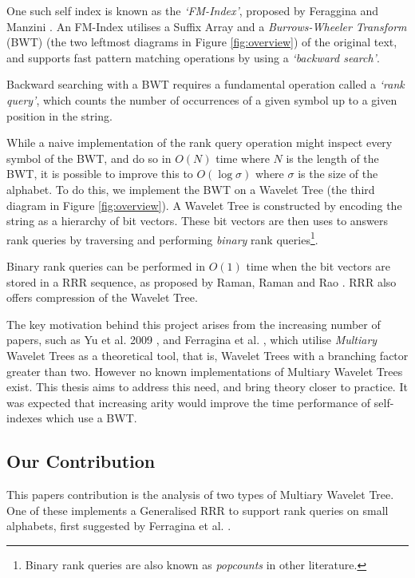One such self index is known as the \emph{`FM-Index'}, proposed by
Feraggina and Manzini \cite{ferragina2000}. An FM-Index utilises a 
Suffix Array and a \emph{Burrows-Wheeler Transform} (BWT) (the two leftmost 
diagrams in Figure \ref{fig:overview}) of the original text, and supports fast 
pattern matching operations by using a \emph{`backward search'}.

Backward searching with a BWT requires a fundamental operation called a 
\emph{`rank query'}, which counts the number of occurrences of a given symbol up 
to a given position in the string.

While a naive implementation of the rank query operation might inspect every 
symbol of the BWT, and do so in $O(N)$ time where $N$ is the length of the BWT, 
it is possible to improve this to $O(\log \sigma)$ where $\sigma$ is the size of 
the alphabet. To do this, we implement the BWT on a Wavelet Tree (the third 
diagram in Figure 
\ref{fig:overview}). A Wavelet Tree is constructed by encoding the string as a 
hierarchy of bit vectors. These bit vectors are then uses to answers rank 
queries by traversing and performing \emph{binary} rank queries\footnote{ Binary rank queries are also known as \emph{popcounts} in other literature.}.

Binary rank queries can be performed in $O(1)$ time when the bit vectors are stored in
a RRR sequence, as proposed by Raman, Raman and Rao \cite{raman2007}. RRR also 
offers compression of the Wavelet Tree.

The key motivation behind this project arises from the increasing number of
papers, such as Yu et al. 2009 \cite{yu2009}, and Ferragina et al. 
\cite{ferragina2007}, which utilise \emph{Multiary} Wavelet Trees as a theoretical tool, that is, Wavelet Trees with a branching 
factor greater than two. However no known implementations of Multiary Wavelet 
Trees exist. This thesis aims to address this need, and bring theory closer to 
practice. It was expected that increasing arity would improve the time 
performance of self-indexes which use a BWT.


\subsection{Our Contribution}

This papers contribution is the analysis of two types of Multiary Wavelet Tree. 
One of these implements a Generalised RRR to support rank queries on small 
alphabets, first suggested by Ferragina et al. \cite{ferragina2007}.

